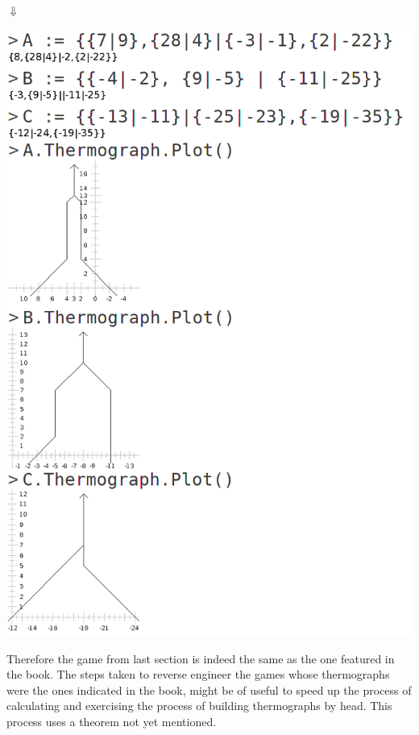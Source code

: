 \begingroup
{}%

\endgroup
\begin{center}
	$\Downarrow$
\end{center}
\begin{center}
\includegraphics[scale=0.3]{../images/resulting_thermographs.png}
\end{center}

Therefore the game from last section is indeed the same as the one featured in the book. The steps taken to reverse engineer the games whose thermographs were the ones indicated in the book, might be of useful to speed up the process of calculating and exercising the process of building thermographs by head. This process uses a theorem not yet mentioned.

